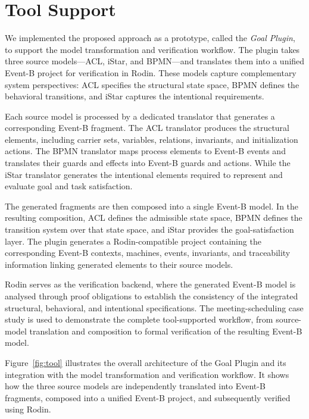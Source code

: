 \documentclass[a4paper, conference]{IEEEtran}
\begin{document}
\section{Tool Support}
\label{sect:toolSupport}

We implemented the proposed approach as a prototype, called the \textit{Goal Plugin}, to support the model transformation and verification workflow. The plugin takes three source models---ACL, iStar, and BPMN---and translates them into a unified Event-B project for verification in Rodin. These models capture complementary system perspectives: ACL specifies the structural state space, BPMN defines the behavioral transitions, and iStar captures the intentional requirements.

Each source model is processed by a dedicated translator that generates a corresponding Event-B fragment. The ACL translator produces the structural elements, including carrier sets, variables, relations, invariants, and initialization actions. The BPMN translator maps process elements to Event-B events and translates their guards and effects into Event-B guards and actions. While the iStar translator generates the intentional elements required to represent and evaluate goal and task satisfaction.

The generated fragments are then composed into a single Event-B model. In the resulting composition, ACL defines the admissible state space, BPMN defines the transition system over that state space, and iStar provides the goal-satisfaction layer. The plugin generates a Rodin-compatible project containing the corresponding Event-B contexts, machines, events, invariants, and traceability information linking generated elements to their source models.

Rodin serves as the verification backend, where the generated Event-B model is analysed through proof obligations to establish the consistency of the integrated structural, behavioral, and intentional specifications. The meeting-scheduling case study is used to demonstrate the complete tool-supported workflow, from source-model translation and composition to formal verification of the resulting Event-B model.

Figure~\ref{fig:tool} illustrates the overall architecture of the Goal Plugin and its integration with the model transformation and verification workflow. It shows how the three source models are independently translated into Event-B fragments, composed into a unified Event-B project, and subsequently verified using Rodin.
\end{document}
